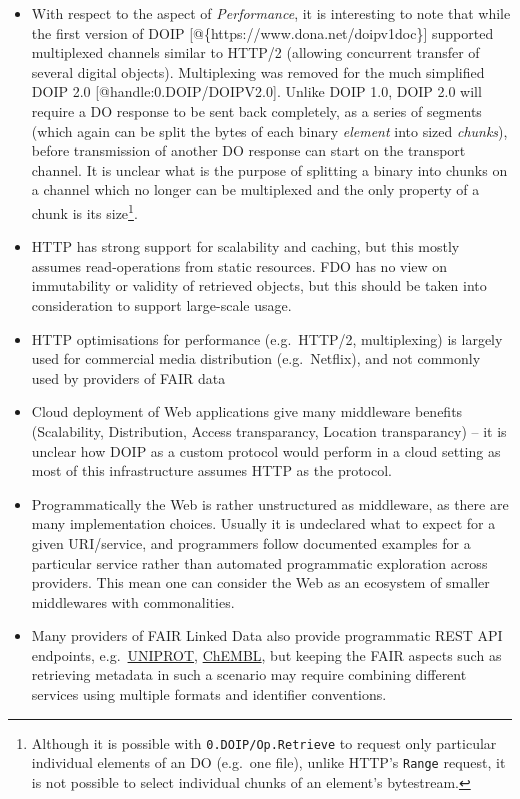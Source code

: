 \begin{itemize}
\tightlist
\item
  With respect to the aspect of \emph{Performance}, it is interesting to
  note that while the first version of DOIP
  {[}@\{https://www.dona.net/doipv1doc\}{]} supported multiplexed
  channels similar to HTTP/2 (allowing concurrent transfer of several
  digital objects). Multiplexing was removed for the much simplified
  DOIP 2.0 {[}@handle:0.DOIP/DOIPV2.0{]}. Unlike DOIP 1.0, DOIP 2.0 will
  require a DO response to be sent back completely, as a series of
  segments (which again can be split the bytes of each binary
  \emph{element} into sized \emph{chunks}), before transmission of
  another DO response can start on the transport channel. It is unclear
  what is the purpose of splitting a binary into chunks on a channel
  which no longer can be multiplexed and the only property of a chunk is
  its size\footnote{Although it is possible with
    \texttt{0.DOIP/Op.Retrieve} to request only particular individual
    elements of an DO (e.g.~one file), unlike HTTP's \texttt{Range}
    request, it is not possible to select individual chunks of an
    element's bytestream.}.
\item
  HTTP has strong support for scalability and caching, but this mostly
  assumes read-operations from static resources. FDO has no view on
  immutability or validity of retrieved objects, but this should be
  taken into consideration to support large-scale usage.
\item
  HTTP optimisations for performance (e.g.~HTTP/2, multiplexing) is
  largely used for commercial media distribution (e.g.~Netflix), and not
  commonly used by providers of FAIR data
\item
  Cloud deployment of Web applications give many middleware benefits
  (Scalability, Distribution, Access transparancy, Location
  transparancy) -- it is unclear how DOIP as a custom protocol would
  perform in a cloud setting as most of this infrastructure assumes HTTP
  as the protocol.
\item
  Programmatically the Web is rather unstructured as middleware, as
  there are many implementation choices. Usually it is undeclared what
  to expect for a given URI/service, and programmers follow documented
  examples for a particular service rather than automated programmatic
  exploration across providers. This mean one can consider the Web as an
  ecosystem of smaller middlewares with commonalities.
\item
  Many providers of FAIR Linked Data also provide programmatic REST API
  endpoints,
  e.g.~\href{https://www.uniprot.org/help/programmatic_access}{UNIPROT},
  \href{https://chembl.gitbook.io/chembl-interface-documentation/web-services}{ChEMBL},
  but keeping the FAIR aspects such as retrieving metadata in such a
  scenario may require combining different services using multiple
  formats and identifier conventions.
\end{itemize}


